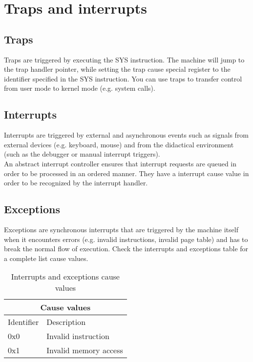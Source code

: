 \documentclass{article}
\begin{document}
\section{Traps and interrupts}
\subsection{Traps}
Traps are triggered by executing the SYS instruction. The machine will jump to the trap handler pointer, while setting the trap cause special register to the identifier specified in the SYS instruction. You can use traps to transfer control from user mode to kernel mode (e.g. system calls).
\subsection{Interrupts}
Interrupts are triggered by external and asynchronous events such as signals from external devices (e.g. keyboard, mouse) and from the didactical environment (such as the debugger or manual interrupt triggers). \\An abstract interrupt controller ensures that interrupt requests are queued in order to be processed in an ordered manner. They have a interrupt cause value in order to be recognized by the interrupt handler.
\subsection{Exceptions}
Exceptions are synchronous interrupts that are triggered by the machine itself when it encounters errors (e.g. invalid instructions, invalid page table) and has to break the normal flow of execution. Check the interrupts and exceptions table for a complete list cause values.
\\

\begin{table}[h!]
\centering
\begin{tabular} { | p{6cm} | p{6cm} |}
  \hline
  \multicolumn{2}{|c|}{Cause values}\\
  \hline
  Identifier & Description\\
  \hline  
  0x0 & Invalid instruction\\
  0x1 & Invalid memory access \\
  
  \hline
  
\end{tabular}

\caption{Interrupts and exceptions cause values}
\end{table}
\end{document}
